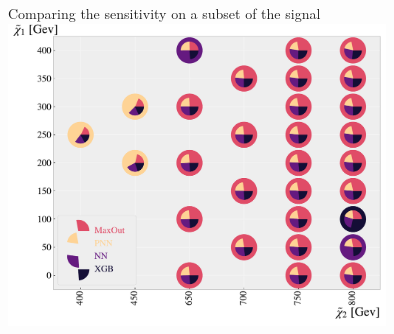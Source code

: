 \documentclass[UKenglish]{beamer}
\begin{document}

\begin{frame}{Comparing the sensitivity on a subset of the signal}
    \centering
    \includegraphics[width=0.75\textwidth]{figures/Comps/GenPlussXGBNetworkComp.pdf}
\end{frame}
\end{document}
